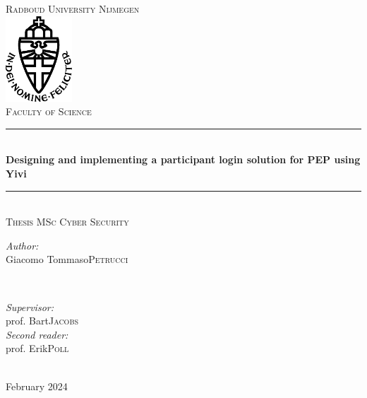 \documentclass{report}
\title{\thesistitle}
\author{\thesisauthorfirst\space\thesisauthorsecond}
\date{\thesisdate}
\def\thesistitle{Designing and implementing a participant login solution for PEP using Yivi}
\def\thesisauthorfirst{Giacomo Tommaso}
\def\thesisauthorsecond{Petrucci}
\def\thesissupervisorfirst{prof. Bart}
\def\thesissupervisorsecond{Jacobs}
\def\thesissecondreaderfirst{prof. Erik}
\def\thesissecondreadersecond{Poll}
\def\thesisdate{February 2024}
\begin{document}
\begin{titlepage}
	\thispagestyle{empty}
	\newcommand{\HRule}{\rule{\linewidth}{0.5mm}}
	\center
	\textsc{\Large Radboud University Nijmegen}\\[.7cm]
	\includegraphics[width=25mm]{in_dei_nomine_feliciter.eps}\\[.5cm]
	\textsc{Faculty of Science}\\[0.5cm]
	
	\HRule \\[0.4cm]
	{ \huge \bfseries \thesistitle}\\[0.1cm]
	\HRule \\[.5cm]
	\textsc{\large Thesis MSc Cyber Security}\\[.5cm]
	
	\begin{minipage}{0.4\textwidth}
	\begin{flushleft} \large
	\emph{Author:}\\
	\thesisauthorfirst\space \textsc{\thesisauthorsecond}
	\end{flushleft}
	\end{minipage}
	~
	\begin{minipage}{0.4\textwidth}
	\begin{flushright} \large
	\emph{Supervisor:} \\
	\thesissupervisorfirst\space \textsc{\thesissupervisorsecond} \\[1em]
	\emph{Second reader:} \\
	\thesissecondreaderfirst\space \textsc{\thesissecondreadersecond}
	\end{flushright}
	\end{minipage}\\[4cm]
	\vfill
	{\large \thesisdate}\\
	\clearpage
\end{titlepage}

\begin{abstract}
	Polymorphic Encryption and Pseudonimisation (PEP) is both a technology and a project developed at iHub to let researchers collect medical data of people taking part in studies, 
	while preserving their privacy. To do so, it uses ElGamal cipher's properties that allow to re-key and re-shuffle encrypted data and participant identifiers called local 
	pseudonyms. While this system effectively safeguards a participant's privacy, it also makes it non-trivial to design a way for the participants to access their own data: due to 
	PEP's privacy goals, the typical login with email and password is out of the question. This thesis presents a conceptual design for a login system for study participants that
	is in line with PEP's data protection goals and a proof of concept implementation of such system. 
\end{abstract}
\end{document}
